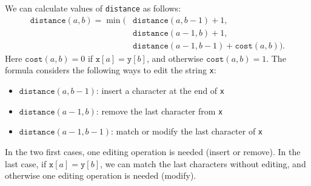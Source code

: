 We can calculate values of \texttt{distance}
as follows:
\begin{equation*}
\begin{split}
\texttt{distance}(a,b) = \min(& \texttt{distance}(a,b-1)+1, \\
                           & \texttt{distance}(a-1,b)+1, \\
                           & \texttt{distance}(a-1,b-1)+\texttt{cost}(a,b)).
\end{split}
\end{equation*}
Here $\texttt{cost}(a,b)=0$ if $\texttt{x}[a]=\texttt{y}[b]$,
and otherwise $\texttt{cost}(a,b)=1$.
The formula considers the following ways to
edit the string \texttt{x}:
\begin{itemize}
\item $\texttt{distance}(a,b-1)$: insert a character at the end of \texttt{x}
\item $\texttt{distance}(a-1,b)$: remove the last character from \texttt{x}
\item $\texttt{distance}(a-1,b-1)$: match or modify the last character of \texttt{x}
\end{itemize}
In the two first cases, one editing operation is needed
(insert or remove).
In the last case, if $\texttt{x}[a]=\texttt{y}[b]$,
we can match the last characters without editing,
and otherwise one editing operation is needed (modify).

